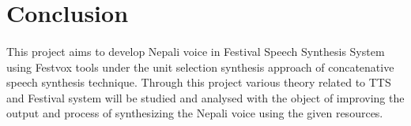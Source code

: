 \documentclass{article}
\begin{document}
	\section{Conclusion}
		\paragraph{}
			This project aims to develop Nepali voice in Festival Speech Synthesis System using Festvox tools under the unit selection synthesis approach of concatenative speech synthesis technique. Through this project various theory related to TTS and Festival system will be studied and analysed with the object of improving the output and process of synthesizing the Nepali voice using the given resources.






	\newpage
	
	
\end{document}
